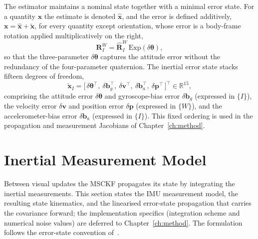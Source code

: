 The estimator maintains a nominal state together with a minimal error state. For a quantity $\mathbf{x}$ the estimate is denoted $\hat{\mathbf{x}}$, and the error is defined additively, $\mathbf{x} = \hat{\mathbf{x}} + \tilde{\mathbf{x}}$, for every quantity except orientation, whose error is a body-frame rotation applied multiplicatively on the right,
\begin{equation}
  \mathbf{R}_{I}^{W} = \hat{\mathbf{R}}_{I}^{W}\,\mathrm{Exp}(\delta\boldsymbol{\theta}),
  \label{eq:bg_att_error}
\end{equation}
so that the three-parameter $\delta\boldsymbol{\theta}$ captures the attitude error without the redundancy of the four-parameter quaternion. The inertial error state stacks fifteen degrees of freedom,
\begin{equation}
  \tilde{\mathbf{x}}_{I} =
  \big[\, \delta\boldsymbol{\theta}^{\top},\ \delta\mathbf{b}_{g}^{\top},\ \delta\mathbf{v}^{\top},\ \delta\mathbf{b}_{a}^{\top},\ \delta\mathbf{p}^{\top} \,\big]^{\top} \in \mathbb{R}^{15},
  \label{eq:bg_error_state}
\end{equation}
comprising the attitude error $\delta\boldsymbol{\theta}$ and gyroscope-bias error $\delta\mathbf{b}_{g}$ (expressed in $\{I\}$), the velocity error $\delta\mathbf{v}$ and position error $\delta\mathbf{p}$ (expressed in $\{W\}$), and the accelerometer-bias error $\delta\mathbf{b}_{a}$ (expressed in $\{I\}$). This fixed ordering is used in the propagation and measurement Jacobians of Chapter~\ref{ch:method}.

\section{Inertial Measurement Model}
\label{sec:bg_imu}
Between visual updates the MSCKF propagates its state by integrating the inertial measurements. This section states the IMU measurement model, the resulting state kinematics, and the linearised error-state propagation that carries the covariance forward; the implementation specifics (integration scheme and numerical noise values) are deferred to Chapter~\ref{ch:method}. The formulation follows the error-state convention of~\cite{Sola_2017}.

